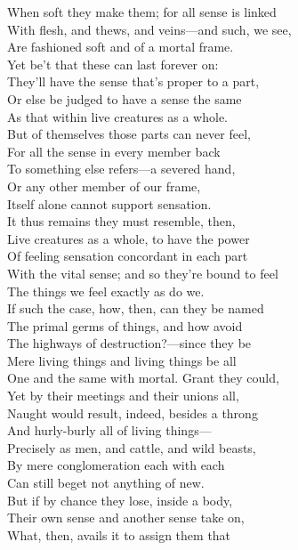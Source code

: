 When soft they make them; for all sense is linked\\
With flesh, and thews, and veins—and such, we see,\\
Are fashioned soft and of a mortal frame.\\
Yet be't that these can last forever on:\\
They'll have the sense that's proper to a part,\\
Or else be judged to have a sense the same\\
As that within live creatures as a whole.\\
But of themselves those parts can never feel,\\
For all the sense in every member back\\
To something else refers—a severed hand,\\
Or any other member of our frame,\\
Itself alone cannot support sensation.\\
It thus remains they must resemble, then,\\
Live creatures as a whole, to have the power\\
Of feeling sensation concordant in each part\\
With the vital sense; and so they're bound to feel\\
The things we feel exactly as do we.\\
If such the case, how, then, can they be named\\
The primal germs of things, and how avoid\\
The highways of destruction?—since they be\\
Mere living things and living things be all\\
One and the same with mortal. Grant they could,\\
Yet by their meetings and their unions all,\\
Naught would result, indeed, besides a throng\\
And hurly-burly all of living things—\\
Precisely as men, and cattle, and wild beasts,\\
By mere conglomeration each with each\\
Can still beget not anything of new.\\
But if by chance they lose, inside a body,\\
Their own sense and another sense take on,\\
What, then, avails it to assign them that\\
